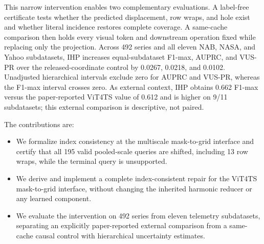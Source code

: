 This narrow intervention enables two complementary evaluations. A label-free
certificate tests whether the predicted displacement, row wraps, and hole
exist and whether
literal incidence restores complete coverage. A same-cache comparison then
holds every visual token and downstream operation fixed while replacing only
the projection. Across 492 series and all eleven NAB, NASA, and Yahoo
subdatasets, IHP increases equal-subdataset F1-max, AUPRC, and VUS-PR over the
released-coordinate control by 0.0267, 0.0218, and 0.0102. Unadjusted
hierarchical intervals exclude zero for AUPRC and VUS-PR, whereas the F1-max
interval crosses zero. As external context, IHP obtains 0.662 F1-max versus
the paper-reported ViT4TS value of 0.612 and is higher on 9/11 subdatasets;
this external comparison is descriptive, not paired.

The contributions are:
\begin{itemize}
  \item We formalize index consistency at the multiscale mask-to-grid
  interface and certify that all 195 valid pooled-scale queries are shifted,
  including 13 row wraps, while the terminal query is unsupported.
  \item We derive and implement a complete index-consistent repair for the
  ViT4TS mask-to-grid interface, without changing the inherited harmonic
  reducer or any learned component.
  \item We evaluate the intervention on 492 series from eleven telemetry
  subdatasets, separating an explicitly paper-reported external comparison
  from a same-cache causal control with hierarchical uncertainty estimates.
\end{itemize}
